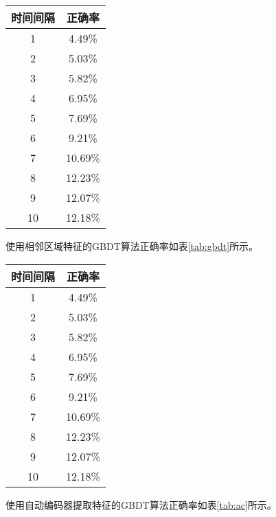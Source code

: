 \begin{table}[!hpb]
    \centering
    \begin{tabular}{@{}cc@{}} \toprule
        时间间隔 & 正确率 \\ \midrule
        1 &	4.49\% \\
        2 &	5.03\% \\
        3 &	5.82\% \\
        4 &	6.95\% \\
        5 &	7.69\% \\
        6 &	9.21\% \\
        7 &	10.69\% \\
        8 &	12.23\% \\
        9 &	12.07\% \\ 
        10 & 12.18\% \\
        \bottomrule
    \end{tabular}
\end{table}

使用相邻区域特征的GBDT算法正确率如表\ref{tab:gbdt}所示。

\begin{table}[!hpb]
    \centering
    \begin{tabular}{@{}cc@{}} \toprule
        时间间隔 & 正确率 \\ \midrule
        1 &	4.49\% \\
        2 &	5.03\% \\
        3 &	5.82\% \\
        4 &	6.95\% \\
        5 &	7.69\% \\
        6 &	9.21\% \\
        7 &	10.69\% \\
        8 &	12.23\% \\
        9 &	12.07\% \\ 
        10 & 12.18\% \\
        \bottomrule
    \end{tabular}
\end{table}

使用自动编码器提取特征的GBDT算法正确率如表\ref{tab:ac}所示。

